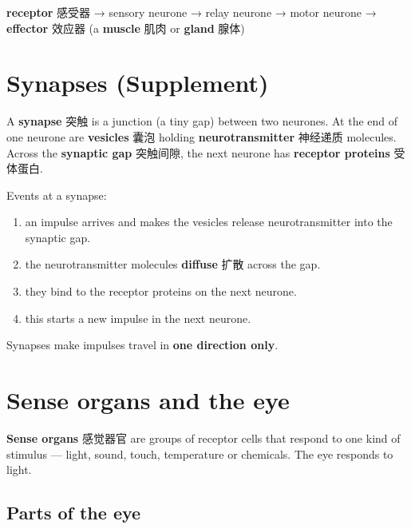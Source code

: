 \documentclass[11pt]{article}
\begin{document}
\textbf{receptor} 感受器 → sensory neurone → relay neurone → motor neurone → \textbf{effector} 效应器 (a \textbf{muscle} 肌肉 or \textbf{gland} 腺体)

\section*{Synapses (Supplement)}

A \textbf{synapse} 突触 is a junction (a tiny gap) between two neurones. At the end of one neurone are \textbf{vesicles} 囊泡 holding \textbf{neurotransmitter} 神经递质 molecules. Across the \textbf{synaptic gap} 突触间隙, the next neurone has \textbf{receptor proteins} 受体蛋白.

Events at a synapse:

\begin{enumerate}
\item an impulse arrives and makes the vesicles release neurotransmitter into the synaptic gap.

\item the neurotransmitter molecules \textbf{diffuse} 扩散 across the gap.

\item they bind to the receptor proteins on the next neurone.

\item this starts a new impulse in the next neurone.

\end{enumerate}

Synapses make impulses travel in \textbf{one direction only}.

\section*{Sense organs and the eye}

\textbf{Sense organs} 感觉器官 are groups of receptor cells that respond to one kind of stimulus — light, sound, touch, temperature or chemicals. The eye responds to light.

\subsection*{Parts of the eye}
\end{document}
